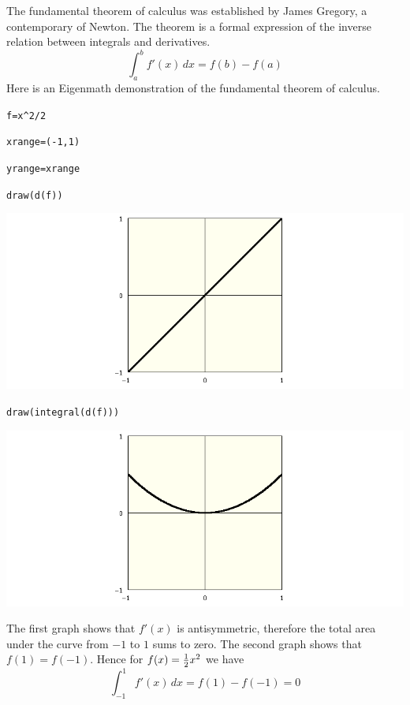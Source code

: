 
\newpage


\bigskip

\noindent
The fundamental theorem of calculus was established by James Gregory,
a contemporary of Newton.
The theorem is a formal expression of the inverse relation between
integrals and derivatives.
$$\int_a^b f'(x)\,dx=f(b)-f(a)$$
Here is an Eigenmath demonstration of the fundamental theorem of calculus.

\medskip
\verb$f=x^2/2$

\verb$xrange=(-1,1)$

\verb$yrange=xrange$

\verb$draw(d(f))$
\begin{center}
\includegraphics[scale=0.4]{funda1.png}
\end{center}

\verb$draw(integral(d(f)))$

\begin{center}
\includegraphics[scale=0.4]{funda2.png}
\end{center}

\noindent
The first graph shows that $f'(x)$ is antisymmetric, therefore the total
area under the curve from $-1$ to $1$ sums to zero.
The second graph shows that $f(1)=f(-1)$.
Hence for $f(x)={1\over2}x^2$ we have
$$\int_{-1}^1f'(x)\,dx=f(1)-f(-1)=0$$

